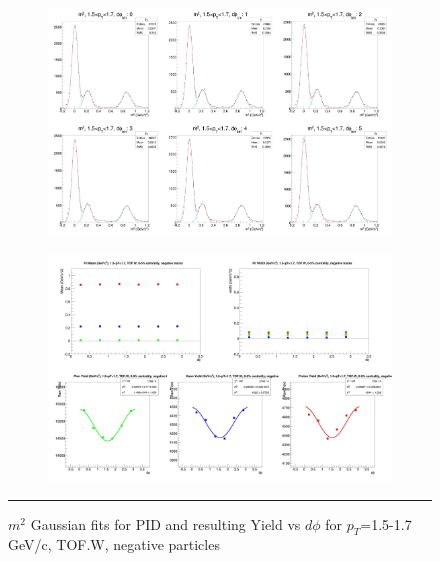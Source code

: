 \begin{figure}[H]
  \centering
    \begin{subfigure}{1\textwidth}
    \includegraphics[width=1\textwidth]{lowptfits/yieldvsdphi_tof1_cent0_ch0_pT-15-17.jpg}
    \end{subfigure}
    \begin{subfigure}{1\textwidth}
    \includegraphics[width=1\textwidth]{lowptfits/fitParams_tof1_cent0_ch0_pT-15-17.jpg}
    \end{subfigure}
    \rule{35em}{0.5pt}
  \caption[PID fits and Yield vs $d\phi$ for $p_T$=1.5-1.7 GeV/c, TOF.W, negative particles ]{$m^2$ Gaussian fits for PID and resulting Yield vs $d\phi$ for $p_T$=1.5-1.7 GeV/c, TOF.W, negative particles}
  \label{fig:fits15-17neg}
\end{figure}

